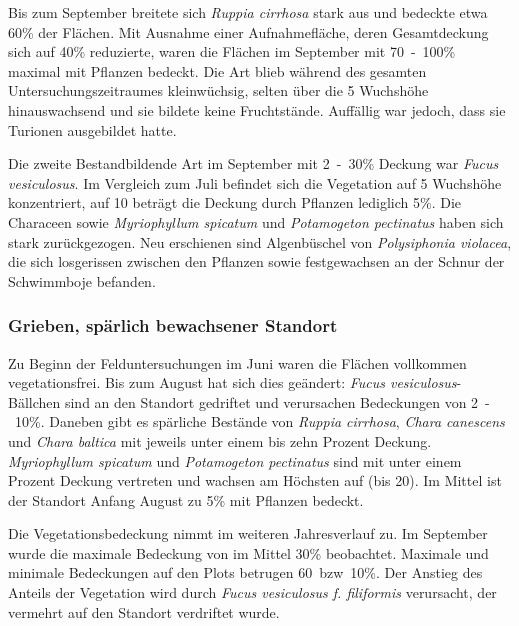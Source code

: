 Bis zum September breitete sich \textit{Ruppia cirrhosa} stark aus und bedeckte etwa \unit{60}{\%} der Flächen. Mit Ausnahme einer Aufnahmefläche, deren Gesamtdeckung sich auf \unit{40}{\%} reduzierte, waren die Flächen im September mit \unit{70-100}{\%} maximal mit Pflanzen bedeckt. Die Art blieb während des gesamten Untersuchungszeitraumes kleinwüchsig, selten über die \unit{5}{\centi\metre} Wuchshöhe hinauswachsend und sie bildete keine Fruchtstände. Auffällig war jedoch, dass sie Turionen ausgebildet hatte.

Die zweite Bestandbildende Art im September mit \unit{2-30}{\%} Deckung war \textit{Fucus vesiculosus}. Im Vergleich zum Juli befindet sich die Vegetation auf \unit{5}{\centi\metre} Wuchshöhe konzentriert, auf \unit{10}{\centi\metre} beträgt die Deckung durch Pflanzen lediglich \unit{5}{\%}. Die Characeen sowie \textit{Myriophyllum spicatum} und \textit{Potamogeton pectinatus} haben sich stark zurückgezogen. Neu erschienen sind Algenbüschel von \textit{Polysiphonia violacea}, die sich losgerissen zwischen den Pflanzen sowie festgewachsen an der Schnur der Schwimmboje befanden. 



\subsubsection{Grieben, spärlich bewachsener Standort}


Zu Beginn der Felduntersuchungen im Juni waren die Flächen vollkommen vegetationsfrei. Bis zum August hat sich dies geändert: \textit{Fucus vesiculosus}-Bällchen sind an den Standort gedriftet und verursachen Bedeckungen von \unit{2-10}{\%}. Daneben gibt es spärliche Bestände von \textit{Ruppia cirrhosa}, \textit{Chara canescens} und \textit{Chara baltica} mit jeweils unter einem bis zehn Prozent Deckung. \textit{Myriophyllum spicatum} und \textit{Potamogeton pectinatus} sind mit unter einem Prozent Deckung vertreten und wachsen am Höchsten auf (bis \unit{20}{\centi\metre}). Im Mittel ist der Standort Anfang August zu \unit{5}{\%} mit Pflanzen bedeckt.

Die Vegetationsbedeckung nimmt im weiteren Jahresverlauf zu. Im September wurde die maximale Bedeckung von im Mittel \unit{30}{\%} beobachtet. Maximale und minimale Bedeckungen auf den Plots betrugen \unit{60 bzw. 10}{\%}. Der Anstieg des Anteils der Vegetation wird durch \textit{Fucus vesiculosus f. filiformis }verursacht, der vermehrt auf den Standort verdriftet wurde.\\



